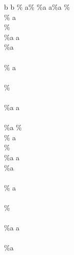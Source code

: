 b
b
\%
a\%
\%a
a\%a
\%
\\\%
a\\\%
\\\%a
a\\\%a
\\\\\%
a\\\\\%
\\\\\%a
a\\\\\%a
\% %
\\\% %
a\\\% %
\\\%a %
a\\\%a %
\\\\\% %
a\\\\\% %
\\\\\%a %
a\\\\\%a %
